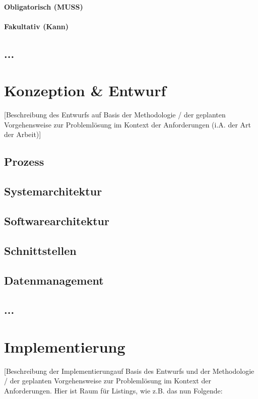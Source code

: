 \documentclass[oneside,bibliography=totocnumbered,BCOR=5mm]{scrbook}%
\theoremstyle{definition}
\theoremstyle{definition}
\theoremstyle{definition}
\theoremstyle{definition}
\theoremstyle{definition}
\theoremstyle{definition}
\begin{document}
\subsubsection{Obligatorisch (MUSS)}
\subsubsection{Fakultativ (Kann)}
\section{...}




\chapter{Konzeption \& Entwurf}
[Beschreibung des Entwurfs auf Basis der Methodologie / der geplanten Vorgehensweise zur Probleml\"osung im Kontext der Anforderungen (i.A. der Art der Arbeit)]
\section{Prozess}
\section{Systemarchitektur}
\section{Softwarearchitektur}
\section{Schnittstellen}
\section{Datenmanagement}
\section{...}



\chapter{Implementierung}

[Beschreibung der Implementierung\footnotemark auf Basis des Entwurfs und der Methodologie / der geplanten Vorgehensweise zur Probleml\"osung im Kontext der Anforderungen. Hier ist Raum f\"ur Listings, wie z.B. das nun Folgende:
\end{document}
